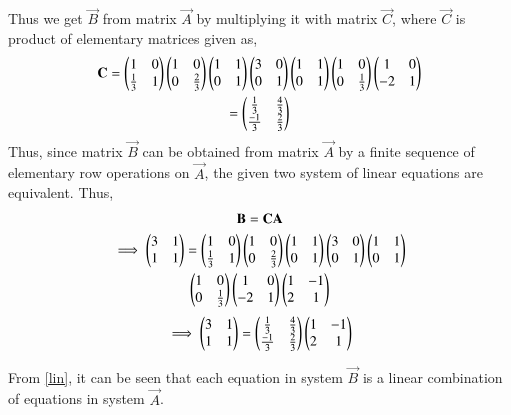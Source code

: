 \documentclass[journal,12pt,twocolumn]{IEEEtran}
\begin{document}
Thus we get $\vec{B}$ from matrix $\vec{A}$ by multiplying it with matrix $\vec{C}$, where $\vec{C}$ is product of elementary matrices given as, 
\begin{multline}
    \mathbf{C} = \begin{pmatrix}1&0\\\frac{1}{3}&1\end{pmatrix}\begin{pmatrix}1&0\\0&\frac{2}{3}\end{pmatrix}\begin{pmatrix}1&1\\0&1\end{pmatrix}\begin{pmatrix}3&0\\0&1\end{pmatrix}\begin{pmatrix}1&1\\0&1\end{pmatrix}\begin{pmatrix}1&0\\0&\frac{1}{3}\end{pmatrix}\begin{pmatrix}1&0\\-2&1\end{pmatrix} \\
    =\begin{pmatrix}\frac{1}{3}&\frac{4}{3} \\ \frac{-1}{3}&\frac{2}{3}\end{pmatrix}
\end{multline}
Thus, since matrix $\vec{B}$ can be obtained from matrix $\vec{A}$ by a finite sequence of elementary row operations on $\vec{A}$, the given two system of linear equations are equivalent. 
Thus, 
\begin{multline}
    \mathbf{B} = \mathbf{C}\mathbf{A} \\
    \implies \begin{pmatrix}3&1\\1&1\end{pmatrix} = \begin{pmatrix}1&0\\\frac{1}{3}&1\end{pmatrix}\begin{pmatrix}1&0\\0&\frac{2}{3}\end{pmatrix}\begin{pmatrix}1&1\\0&1\end{pmatrix}\begin{pmatrix}3&0\\0&1\end{pmatrix}\begin{pmatrix}1&1\\0&1\end{pmatrix}\\
    \begin{pmatrix}1&0\\0&\frac{1}{3}\end{pmatrix}\begin{pmatrix}1&0\\-2&1\end{pmatrix}\begin{pmatrix}1&-1\\2&1\end{pmatrix}
\end{multline}
\begin{align}
    \implies \begin{pmatrix}3&1\\1&1\end{pmatrix} = \begin{pmatrix}\frac{1}{3}&\frac{4}{3} \\ \frac{-1}{3}&\frac{2}{3}\end{pmatrix}\begin{pmatrix}1&-1\\2&1\end{pmatrix} \label{lin}
\end{align}

From \eqref{lin}, it can be seen that each equation in system $\vec{B}$ is a linear combination of equations in system $\vec{A}$. 
\end{document}
